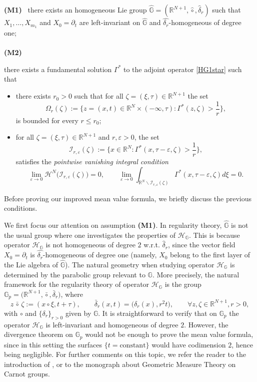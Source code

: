 \documentclass[11pt,a4paper]{article}
\numberwithin{equation}{section}
\newcommand{\R}{\mathbb{R}}
\def \rnn {{\mathbb {R}}^{N+1}}
\def \GG {{\mathbb{G}}}
\def \p {\partial}
\def \H {\mathscr{H}_\GG}
\def \G {{\Gamma}}
\def \d {{\delta}}
\def \e {{\varepsilon}}
\def \t {{\tau}}
\def \x {{\xi}}
\def \z {{\zeta}}
\begin{document}
\medskip
\noindent
{{\bf(M1)}} \ {there exists an homogeneous Lie group $\widehat{\GG} = \left(\rnn,\widehat\circ,\widehat\delta_r\right)$ such that $X_1,\ldots,X_{m_1}$ and $X_0 = \p_t$ are left-invariant on $\widehat\GG$ and $\widehat{\d_r}$-homogeneous of degree one;}
\\\\{{\bf(M2)}} \ {there exists a fundamental solution $\G^*$ to the adjoint operator \eqref{HG1star} such that
\begin{itemize}
	\item there exists $r_0>0$ such that for all $\z=(\x,\t) \in \R^{N+1}$ the set 
	\begin{equation}\label{set-mvf}
		\Omega_r(\z):= \biggl\{ z=(x,t) \in \R^N \times (-\infty,\t): \Gamma^*(z,\z)>\frac{1}{r}\biggr\},
	\end{equation}
	is bounded for every $r \leq r_0$;
	\item for all $\z=(\x,\t)\in\rnn$ and $r,\e>0$, the set
	\begin{equation}
		\mathcal{I}_{r,\e}(\z):= \biggl\{ x \in \R^N : \Gamma^*(x,\t-\e,\z)>\frac{1}{r}\biggr\},
	\end{equation}
	satisfies the \emph{pointwise vanishing integral condition}
	\begin{equation}\label{pointwise-vanishing}
		\lim_{\varepsilon \to 0} {\mathscr H}^{N} \big( \mathcal{I}_{r, \varepsilon} (\z) \big) = 0, \qquad
		\lim_{\varepsilon \to 0} \int_{\R^N \backslash \mathcal{I}_{r, \varepsilon} (\z)} \Gamma^*(x,\t - \varepsilon,\z) d \x = 0.
	\end{equation}
\end{itemize}
Before proving our improved mean value formula, we briefly discuss the previous conditions.


We first focus our attention on assumption \textbf{(M1)}. In regularity theory, $\widehat\GG$ is not the usual group where one investigates the properties of $\H$. This is because operator $\H$ is not homogeneous of degree $2$ w.r.t. $\widehat\delta_r$, since the vector field $X_0=\p_t$ is $\widehat{\d_r}$-homogeneous of degree one (namely, $X_0$ belong to the first layer of the Lie algebra of $\widehat{\GG}$). The natural geometry when
studying operator $\H$ is determined by the parabolic  group relevant to $\GG$. More precisely, the natural framework for the regularity theory of operator $\H$ is the group $\GG_p=\Big(\rnn,\bar\circ,\bar \delta_r\Big)$, where
\begin{equation}
		z\,\bar\circ\,\z :=\left(x\circ \xi,t+\t\right),\qquad \bar\d_{r}(x,t)=\Big(\d_r(x),r^2t\Big),\qquad \forall z,\z \in \rnn, r>0,
\end{equation}
with $\circ$ and $\{\delta_r\}_{r>0}$ given by $\GG$. It is straightforward to verify that on  $\GG_p$ the operator $\H$ is left-invariant and homogeneous of degree $2$. However, the divergence theorem on $\GG_p$ would not be enough to prove the mean value formula, since in this setting the surfaces $\{t = \text{constant}\}$ would have codimension $2$, hence being negligible. For further comments on this topic, we refer the reader to the introduction of \cite{pallara2023meanvalueformulasclassical}, or to the  monograph \cite{cassano2016some} about Geometric Measure Theory on Carnot groups.


}
\end{document}
